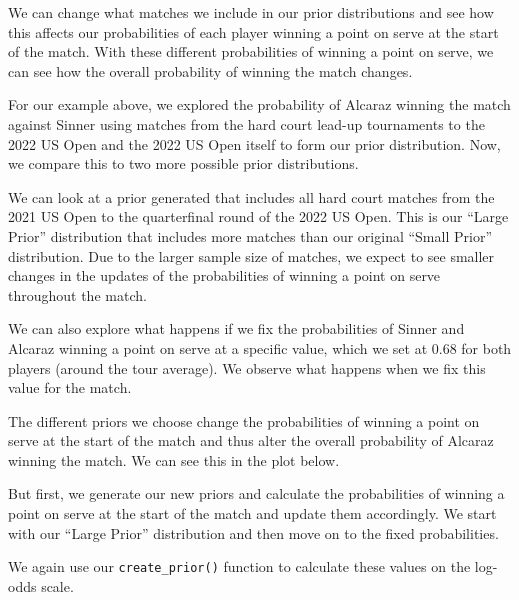 \documentclass[
  letterpaper,
  DIV=11,
  numbers=noendperiod]{scrartcl}
\begin{document}
We can change what matches we include in our prior distributions and see
how this affects our probabilities of each player winning a point on
serve at the start of the match. With these different probabilities of
winning a point on serve, we can see how the overall probability of
winning the match changes.

For our example above, we explored the probability of Alcaraz winning
the match against Sinner using matches from the hard court lead-up
tournaments to the 2022 US Open and the 2022 US Open itself to form our
prior distribution. Now, we compare this to two more possible prior
distributions.

We can look at a prior generated that includes all hard court matches
from the 2021 US Open to the quarterfinal round of the 2022 US Open.
This is our ``Large Prior'' distribution that includes more matches than
our original ``Small Prior'' distribution. Due to the larger sample size
of matches, we expect to see smaller changes in the updates of the
probabilities of winning a point on serve throughout the match.

We can also explore what happens if we fix the probabilities of Sinner
and Alcaraz winning a point on serve at a specific value, which we set
at 0.68 for both players (around the tour average). We observe what
happens when we fix this value for the match.

The different priors we choose change the probabilities of winning a
point on serve at the start of the match and thus alter the overall
probability of Alcaraz winning the match. We can see this in the plot
below.

But first, we generate our new priors and calculate the probabilities of
winning a point on serve at the start of the match and update them
accordingly. We start with our ``Large Prior'' distribution and then
move on to the fixed probabilities.

We again use our \texttt{create\_prior()} function to calculate these
values on the log-odds scale.

\linespread{0.9}
\end{document}
